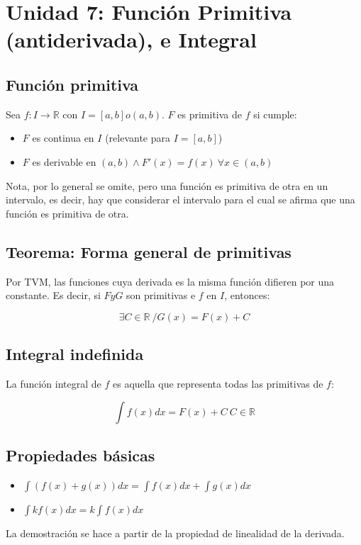 \documentclass{report}
\begin{document}
\chapter{Unidad 7: Función Primitiva (antiderivada), e Integral}
	\section{Función primitiva}
		Sea $f:I\to \mathbb{R}$ con $I=[a,b] o (a,b)$. $F$ es primitiva de $f$ si cumple:
		
		\begin{itemize}
			\item $F$ es continua en $I$ (relevante para $I=[a,b]$)
			\item $F$ es derivable en $(a,b) \wedge F'(x)=f(x) \ \forall x \in (a,b)$
		\end{itemize}
	
		Nota, por lo general se omite, pero una función es primitiva de otra en un intervalo, es decir, hay que considerar el intervalo para el cual se afirma que una función es primitiva de otra.
	
	\section{Teorema: Forma general de primitivas}
		Por TVM, las funciones cuya derivada es la misma función difieren por una constante. Es decir, si $F y G$ son primitivas e $f$ en $I$, entonces:
		
		$$ \exists C \in \mathbb{R} \ / G(x) = F(x)+C$$
		
	\section{Integral indefinida}
		La función integral de $f$ es aquella que representa todas las primitivas de $f$:
		
		$$\int f(x) dx = F(x) + C \ C \in \mathbb{R}$$
		
	\section{Propiedades básicas}
		\begin{itemize}
			\item $\int(f(x)+g(x))dx = \int f(x)dx + \int g(x) dx$
			\item $\int kf(x)dx = k \int f(x)dx$
		\end{itemize}
	
		La demostración se hace a partir de la propiedad de linealidad de la derivada.
		
\end{document}
